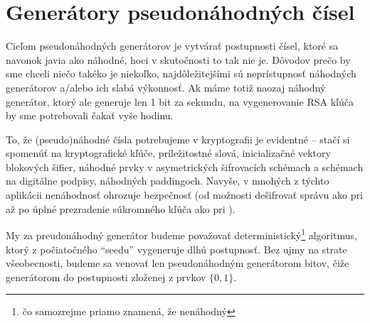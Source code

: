 \section{Generátory pseudonáhodných čísel}

Cieľom pseudonáhodných generátorov je vytvárať postupnosti čísel, ktoré sa
navonok javia ako náhodné, hoci v skutočnosti to tak nie je. Dôvodov prečo
by sme chceli niečo takéko je niekoľko, najdôležitejšími sú neprístupnosť
náhodných generátorov a/alebo ich slabá výkonnosť. Ak máme totiž naozaj
náhodný generátor, ktorý ale generuje len 1 bit za sekundu, na
vygenerovanie RSA kľúča by sme potrebovali čakať vyše hodinu.

To, že (pseudo)náhodné čísla potrebujeme v kryptografii je evidentné --
stačí si spomenúť na kryptografické kľúče, príležitostné slová,
inicializačné vektory blokových šifier, náhodné prvky v asymetrických
šifrovacích schémach a schémach na digitálne podpisy, náhodných paddingoch.
Navyše, v mnohých z týchto aplikácii nenáhodnosť ohrozuje bezpečnosť (od
možnosti dešifrovať správu ako pri \todo{} až po úplné prezradenie
súkromného kľúča ako pri \todo{}).

My za preudonáhodný generátor budeme považovať deterministický\footnote{
čo samozrejme priamo znamená, že nenáhodný} algoritmus, ktorý z
počiatočného ``seedu'' vygeneruje dlhú postupnosť. Bez ujmy na strate
všeobecnosti, budeme sa venovať len pseudonáhodným generátorom bitov, čiže
generátorom do postupnosti zloženej z prvkov $\{0,1\}$.



